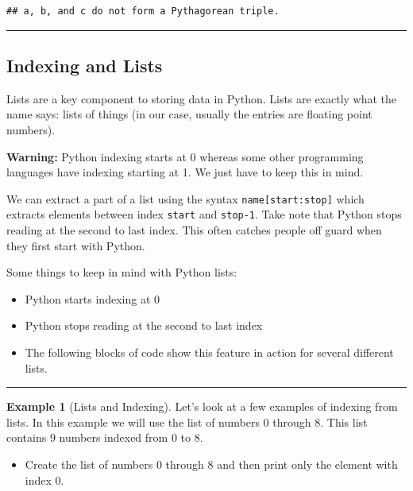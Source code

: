 \documentclass[
]{book}
\providecommand{\tightlist}{%
  \setlength{\itemsep}{0pt}\setlength{\parskip}{0pt}}
\theoremstyle{definition}
\theoremstyle{definition}
\newtheorem{example}{Example}[chapter]
\theoremstyle{definition}
\theoremstyle{remark}
\begin{document}
\begin{verbatim}
## a, b, and c do not form a Pythagorean triple.
\end{verbatim}

\begin{center}\rule{0.5\linewidth}{0.5pt}\end{center}

\hypertarget{indexing-and-lists}{%
\subsection{Indexing and Lists}\label{indexing-and-lists}}

Lists are a key component to storing data in Python. Lists are exactly what the name says: lists of things (in our case, usually the entries are floating point numbers).

\textbf{Warning:} Python indexing starts at 0 whereas some other programming languages have indexing starting at 1. We just have to keep this in mind.

We can extract a part of a list using the syntax \texttt{name{[}start:stop{]}} which extracts elements between index \texttt{start} and \texttt{stop-1}. Take note that Python stops reading at the second to last index. This often catches people off guard when they first start with Python.

Some things to keep in mind with Python lists:

\begin{itemize}
\tightlist
\item
  Python starts indexing at 0
\item
  Python stops reading at the second to last index
\item
  The following blocks of code show this feature in action for several different lists.
\end{itemize}

\begin{center}\rule{0.5\linewidth}{0.5pt}\end{center}

\begin{example}[Lists and Indexing]
\protect\hypertarget{exm:unnamed-chunk-633}{}{\label{exm:unnamed-chunk-633} {} }Let's look at a few examples of indexing from lists. In this example we will use the list of numbers 0 through 8. This list contains 9 numbers indexed from 0 to 8.

\begin{itemize}
\tightlist
\item
  Create the list of numbers 0 through 8 and then print only the element with index 0.
\end{itemize}
\end{example}
\end{document}
